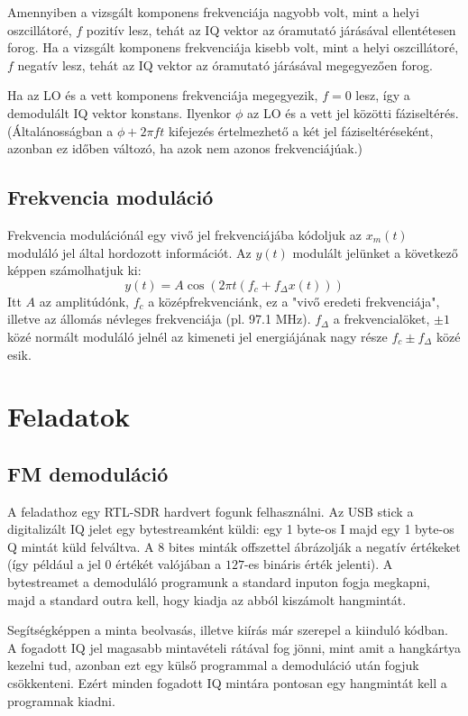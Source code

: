 \documentclass[12pt,a4paper]{article}
\begin{document}
Amennyiben a vizsgált komponens frekvenciája nagyobb volt, mint a helyi oszcillátoré, $f$ pozitív lesz, tehát az IQ vektor
az óramutató járásával ellentétesen forog.
Ha a vizsgált komponens frekvenciája kisebb volt, mint a helyi oszcillátoré, $f$ negatív lesz, tehát az IQ vektor
az óramutató járásával megegyezően forog.

Ha az LO és a vett komponens frekvenciája megegyezik, $f = 0$ lesz, így a demodulált IQ vektor konstans.
Ilyenkor $\phi$ az LO és a vett jel közötti fáziseltérés.
(Általánosságban a $\phi + 2\pi ft$ kifejezés értelmezhető a két jel fáziseltéréseként, azonban ez időben változó, ha azok nem azonos frekvenciájúak.)


\subsection{Frekvencia moduláció}

Frekvencia modulációnál egy vivő jel frekvenciájába kódoljuk az $x_m(t)$ moduláló jel által hordozott információt. Az $y(t)$ modulált jelünket a következő képpen számolhatjuk ki:
\[
  y(t) = A \cos(2 \pi t ( f_c + f_{\Delta} x(t) ) )
\]
Itt $A$ az amplitúdónk, $f_c$ a középfrekvenciánk, ez a "vivő eredeti frekvenciája", illetve az állomás névleges frekvenciája (pl. 97.1 MHz). 
$f_{\Delta}$ a frekvencialöket, $\pm 1$ közé normált moduláló jelnél az kimeneti jel energiájának nagy része $f_c \pm f_{\Delta}$ közé esik.

\clearpage
\section{Feladatok}

\subsection{FM demoduláció}

A feladathoz egy RTL-SDR hardvert fogunk felhasználni.
Az USB stick a digitalizált IQ jelet egy bytestreamként küldi: egy 1 byte-os I majd egy 1 byte-os Q mintát küld felváltva.
A 8 bites minták offszettel ábrázolják a negatív értékeket (így például a jel $0$ értékét valójában a $127$-es bináris érték jelenti).
A bytestreamet a demoduláló programunk a standard inputon fogja megkapni, majd a standard outra kell, hogy kiadja az abból kiszámolt hangmintát.

Segítségképpen a minta beolvasás, illetve kiírás már szerepel a kiinduló kódban.
A fogadott IQ jel magasabb mintavételi rátával fog jönni, mint amit a hangkártya kezelni tud, azonban ezt egy külső programmal a demoduláció után fogjuk csökkenteni.
Ezért minden fogadott IQ mintára pontosan egy hangmintát kell a programnak kiadni.
\end{document}
